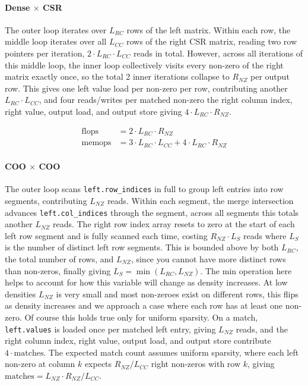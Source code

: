 \documentclass[sigconf, review, anonymous]{acmart}
\begin{document}
\paragraph{Dense $\times$ CSR}
The outer loop iterates over $L_{RC}$ rows of the left matrix. Within each row, the middle
loop iterates over all $L_{CC}$ rows of the right CSR matrix, reading two row pointers per
iteration, $2 \cdot L_{RC} \cdot L_{CC}$ reads in total. However, across all iterations of
this middle loop, the inner loop collectively visits every non-zero of the right matrix exactly
once, so the total 2 inner iterations collapse to $R_{NZ}$ per output row. This gives one left
value load per non-zero per row, contributing another $L_{RC} \cdot L_{CC}$, and four reads/writes
per matched non-zero the right column index, right value, output load, and output store
giving $4 \cdot L_{RC} \cdot R_{NZ}$.

\begin{align}
\text{flops}  &= 2 \cdot L_{RC} \cdot R_{NZ} \\
\text{memops} &= 3 \cdot L_{RC} \cdot L_{CC} + 4 \cdot L_{RC} \cdot R_{NZ}
\end{align}

\paragraph{COO $\times$ COO}
The outer loop scans \texttt{left.row\_indices} in full to group left entries into row segments,
contributing $L_{NZ}$ reads. Within each segment, the merge intersection advances
\texttt{left.col\_indices} through the segment, across all segments this totals
another $L_{NZ}$ reads. The right row index array resets to zero at the start of each left row
segment and is fully scanned each time, costing $R_{NZ} \cdot L_S$ reads where $L_S$ is the
number of distinct left row segments. This is bounded above by both $L_{RC}$, the total number
of rows, and $L_{NZ}$, since you cannot have more distinct rows than non-zeros, finally giving
$L_S = \min(L_{RC}, L_{NZ})$. The min operation here helps to account for how this variable will change as density increases. At low densities $L_{NZ}$ is very small and most non-zeroes exist on different rows, this flips as density increases and we approach a case where each row has at least one non-zero. Of course this holds true only for uniform sparsity. On a match, \texttt{left.values} is loaded once per matched left
entry, giving $L_{NZ}$ reads, and the right column index, right value, output load, and output
store contribute $4 \cdot \text{matches}$. The expected match count assumes uniform sparsity,
where each left non-zero at column $k$ expects $R_{NZ} / L_{CC}$ right non-zeros with row $k$,
giving $\text{matches} = L_{NZ} \cdot R_{NZ} / L_{CC}$.
\end{document}

